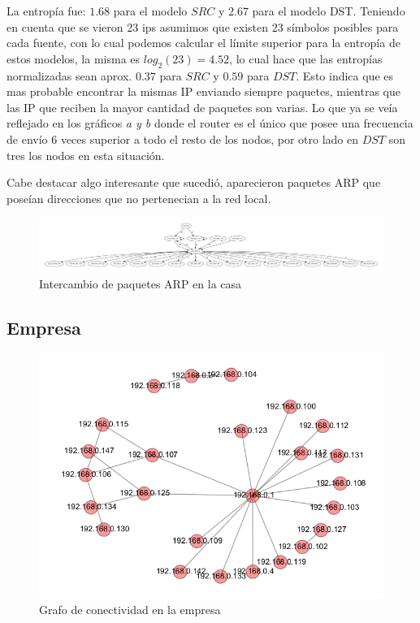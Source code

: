La entrop\'ia fue: $1.68$ para el modelo $SRC$ y $2.67$ para el modelo DST.
Teniendo en cuenta que se vieron 23 ips asumimos que existen 23 s\'imbolos
posibles para cada fuente, con lo cual podemos calcular el l\'imite
superior para la entrop\'ia de estos modelos, la misma es $log_2(23)=4.52$, lo 
cual hace que las entrop\'ias normalizadas sean aprox. $0.37$ para $SRC$ y 
$0.59$ para $DST$. Esto indica que es mas probable encontrar la mismas 
IP enviando siempre paquetes, mientras que las IP que reciben la mayor
cantidad de paquetes son varias. Lo que ya se ve\'ia reflejado en los gr\'aficos
\emph{a y b} donde el router es el \'unico que posee una frecuencia de
env\'io 6 veces superior a todo el resto de los nodos, por otro lado en $DST$
son tres los nodos en esta situaci\'on.

Cabe destacar algo interesante que sucedi\'o, aparecieron paquetes ARP que
pose\'ian direcciones que no pertenecian a la red local.


\begin{figure}[!h]
	\begin{center}
		  \includegraphics[scale=0.3]{resultados/casa/conectividad.pdf}
		  \caption{Intercambio de paquetes ARP en la casa}
		  \label{fig:contra1}
	\end{center}
\end{figure}


\subsection{Empresa}

\begin{figure}[!h]
	\begin{center}
		  \includegraphics[scale=0.6]{resultados/empresa/conectividadNX.png}
		  \caption{Grafo de conectividad en la empresa}
		  \label{fig:contra1}
	\end{center}
\end{figure}

